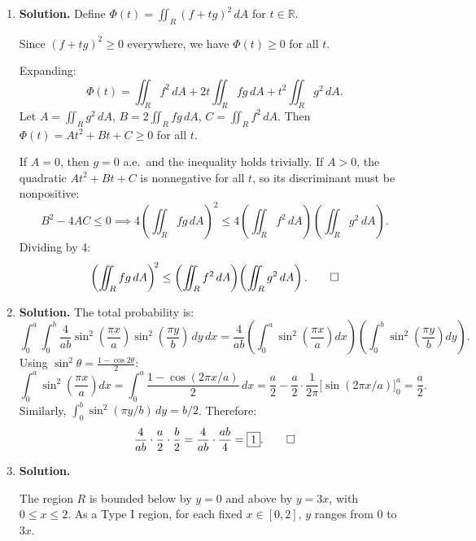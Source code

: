 \begin{enumerate}
\item \textbf{Solution.}
Define $\displaystyle\Phi(t) = \iint_R (f + tg)^2\,dA$ for $t \in \mathbb{R}$.

Since $(f+tg)^2 \geq 0$ everywhere, we have $\Phi(t) \geq 0$ for all $t$.

Expanding:
\[
\Phi(t) = \iint_R f^2\,dA + 2t\iint_R fg\,dA + t^2\iint_R g^2\,dA.
\]
Let $A = \iint_R g^2\,dA$, $B = 2\iint_R fg\,dA$, $C = \iint_R f^2\,dA$. Then $\Phi(t) = At^2 + Bt + C \geq 0$ for all $t$.

If $A = 0$, then $g = 0$ a.e.\ and the inequality holds trivially. If $A > 0$, the quadratic $At^2 + Bt + C$ is nonnegative for all $t$, so its discriminant must be nonpositive:
\[
B^2 - 4AC \leq 0 \implies 4\left(\iint_R fg\,dA\right)^{\!2} \leq 4\left(\iint_R f^2\,dA\right)\!\left(\iint_R g^2\,dA\right).
\]
Dividing by 4:
\[
\left(\iint_R fg\,dA\right)^{\!2} \leq \left(\iint_R f^2\,dA\right)\!\left(\iint_R g^2\,dA\right). \qed
\]

\item \textbf{Solution.}
The total probability is:
\[
\int_0^a\int_0^b \frac{4}{ab}\sin^2\!\left(\frac{\pi x}{a}\right)\sin^2\!\left(\frac{\pi y}{b}\right)\,dy\,dx = \frac{4}{ab}\left(\int_0^a\sin^2\!\left(\frac{\pi x}{a}\right)dx\right)\!\left(\int_0^b\sin^2\!\left(\frac{\pi y}{b}\right)dy\right).
\]
Using $\sin^2\theta = \frac{1-\cos 2\theta}{2}$:
\[
\int_0^a\sin^2\!\left(\frac{\pi x}{a}\right)dx = \int_0^a\frac{1-\cos(2\pi x/a)}{2}\,dx = \frac{a}{2} - \frac{a}{2}\cdot\frac{1}{2\pi}\bigl[\sin(2\pi x/a)\bigr]_0^a = \frac{a}{2}.
\]
Similarly, $\int_0^b\sin^2(\pi y/b)\,dy = b/2$. Therefore:
\[
\frac{4}{ab}\cdot\frac{a}{2}\cdot\frac{b}{2} = \frac{4}{ab}\cdot\frac{ab}{4} = \boxed{1}. \qed
\]

\item \textbf{Solution.}
\begin{center}
\end{center}
The region $R$ is bounded below by $y=0$ and above by $y=3x$, with $0\le x\le 2$. As a Type I region, for each fixed $x\in[0,2]$, $y$ ranges from $0$ to $3x$.


\end{enumerate}

